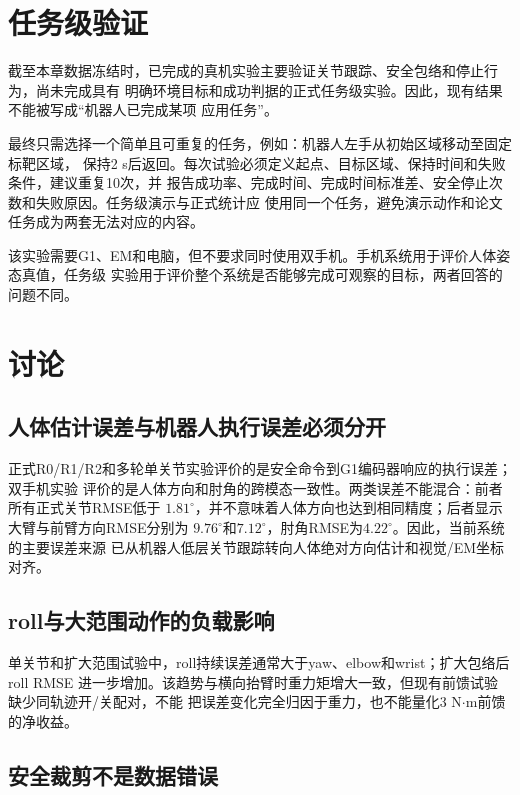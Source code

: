 \section{任务级验证}
\label{sec:ch7_task_validation}

截至本章数据冻结时，已完成的真机实验主要验证关节跟踪、安全包络和停止行为，尚未完成具有
明确环境目标和成功判据的正式任务级实验。因此，现有结果不能被写成“机器人已完成某项
应用任务”。

最终只需选择一个简单且可重复的任务，例如：机器人左手从初始区域移动至固定标靶区域，
保持2 s后返回。每次试验必须定义起点、目标区域、保持时间和失败条件，建议重复10次，并
报告成功率、完成时间、完成时间标准差、安全停止次数和失败原因。任务级演示与正式统计应
使用同一个任务，避免演示动作和论文任务成为两套无法对应的内容。

该实验需要G1、EM和电脑，但不要求同时使用双手机。手机系统用于评价人体姿态真值，任务级
实验用于评价整个系统是否能够完成可观察的目标，两者回答的问题不同。

\section{讨论}
\label{sec:ch7_discussion}

\subsection{人体估计误差与机器人执行误差必须分开}

正式R0/R1/R2和多轮单关节实验评价的是安全命令到G1编码器响应的执行误差；双手机实验
评价的是人体方向和肘角的跨模态一致性。两类误差不能混合：前者所有正式关节RMSE低于
$1.81^\circ$，并不意味着人体方向也达到相同精度；后者显示大臂与前臂方向RMSE分别为
$9.76^\circ$和$7.12^\circ$，肘角RMSE为$4.22^\circ$。因此，当前系统的主要误差来源
已从机器人低层关节跟踪转向人体绝对方向估计和视觉/EM坐标对齐。

\subsection{roll与大范围动作的负载影响}

单关节和扩大范围试验中，roll持续误差通常大于yaw、elbow和wrist；扩大包络后roll RMSE
进一步增加。该趋势与横向抬臂时重力矩增大一致，但现有前馈试验缺少同轨迹开/关配对，不能
把误差变化完全归因于重力，也不能量化3 N$\cdot$m前馈的净收益。

\subsection{安全裁剪不是数据错误}

